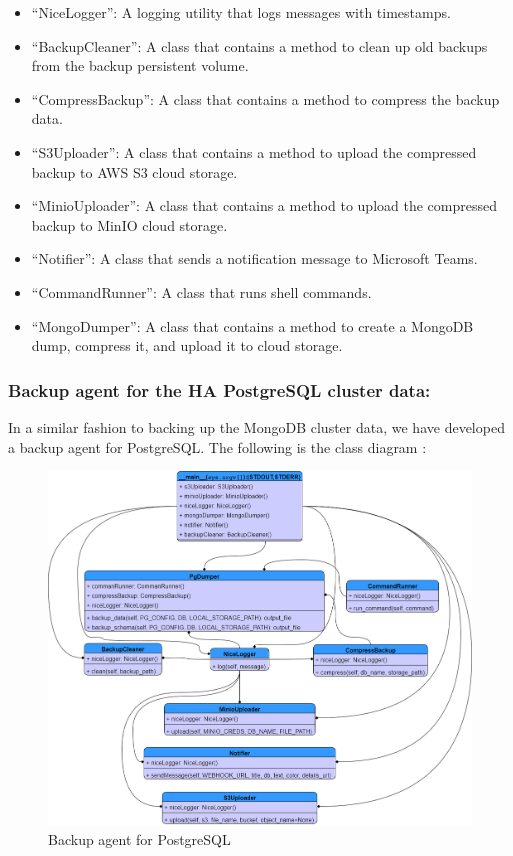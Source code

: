 \begin{itemize}[label={--}]
\item “NiceLogger”: A logging utility that logs messages with timestamps. 
\item “BackupCleaner”: A class that contains a method to clean up old backups from the backup persistent volume. 
\item  “CompressBackup”: A class that contains a method to compress the backup  data. 
\item  “S3Uploader”: A class that contains a method to upload the compressed backup to AWS S3 cloud storage. 
\item “MinioUploader”: A class that contains a method to upload the compressed backup to MinIO cloud storage. 
\item  “Notifier”: A class that sends a notification message to Microsoft Teams. 
\item  “CommandRunner”: A class that runs shell commands. 
\item “MongoDumper”: A class that contains a method to create a MongoDB dump, compress it, and upload it to cloud storage. 
\end{itemize}
 

\subsubsection{Backup agent for the HA PostgreSQL cluster data: }

In a similar fashion to backing up the MongoDB cluster data, we have developed a backup agent for PostgreSQL. The following is the class diagram : 

\begin{figure}[H]\centering
\includegraphics[width=1.0\textwidth,angle=00]{assets/f59.png}
\caption{Backup agent for PostgreSQL}
\label{fig:f59}
\end{figure}


